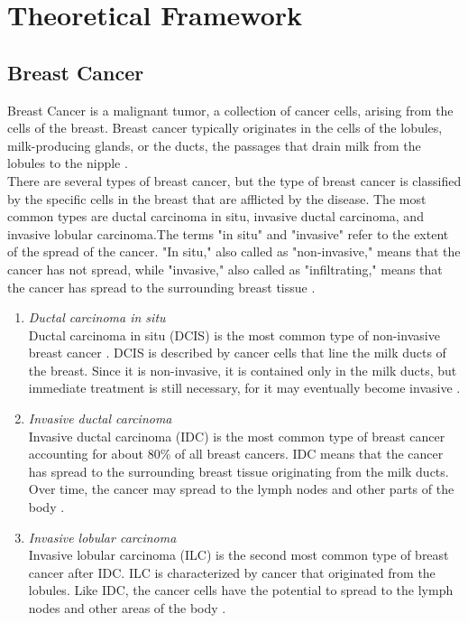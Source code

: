 \section{Theoretical Framework}
\subsection{Breast Cancer}
\qquad Breast Cancer is a malignant tumor, a collection of cancer cells, arising from the cells of the breast. Breast cancer typically originates in the cells of the lobules, milk-producing glands, or the ducts, the passages that drain milk from the lobules to the nipple \cite{breastCancer}. \\

	There are several types of breast cancer, but the type of breast cancer is classified by the specific cells in the breast that are afflicted by the disease. The most common types are ductal carcinoma in situ, invasive ductal carcinoma, and invasive lobular carcinoma.The terms "in situ" and "invasive" refer to the extent of the spread of the cancer. "In situ," also called as "non-invasive," means that the cancer has not spread, while "invasive," also called as "infiltrating," means that the cancer has spread to the surrounding breast tissue \cite{breastCancerTypes}.

\begin{enumerate}
	\item \textit{Ductal carcinoma in situ} \\
	Ductal carcinoma in situ (DCIS) is the most common type of non-invasive breast cancer \cite{breastCancerOrgDCIS}. DCIS is described by cancer cells that line the milk ducts of the breast. Since it is non-invasive, it is contained only in the milk ducts, but immediate treatment is still necessary, for it may eventually become invasive \cite{ACSDCIS}.

	\item \textit{Invasive ductal carcinoma} \\
	Invasive ductal carcinoma (IDC) is the most common type of breast cancer accounting for about 80\% of all breast cancers. IDC means that the cancer has spread to the surrounding breast tissue originating from the milk ducts. Over time, the cancer may spread to the lymph nodes and other parts of the body \cite{breastCancerOrgIDC}.

	\item \textit{Invasive lobular carcinoma} \\
	Invasive lobular carcinoma (ILC) is the second most common type of breast cancer after IDC. ILC is characterized by cancer that originated from the lobules. Like IDC, the cancer cells have the potential to spread to the lymph nodes and other areas of the body \cite{breastCancerOrgILC}.
	
\end{enumerate}

